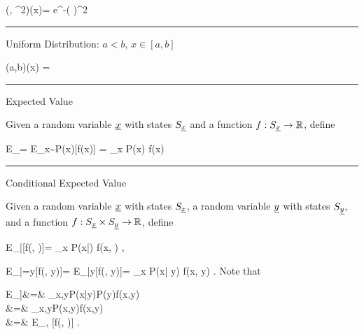 \beq 
\caln(\mu, \sigma^2)(x)=
e^{-\left(
\right)^2}
\eeq
\hrule\noindent
Uniform Distribution: $a<b$, $x\in [a,b]$

\beq
\calu(a,b)(x) =
\eeq
\hrule\noindent
Expected Value

Given a random variable ${\underline{x}}$ with states $S_{\underline{x}}$ and a function $f:S_{\underline{x}}\rightarrow { \mathbb{R}}$, define

\beq
E_\rvx[f(\rvx)]=
E_{x\sim P(x)}[f(x)] = \sum_x P(x) f(x)
\eeq
\hrule\noindent
Conditional Expected Value

Given a random variable ${\underline{x}}$ with states $S_{\underline{x}}$, a random variable ${\underline{y}}$ with states $S_{\underline{y}},$ and a function $f:S_{\underline{x}}\times S_{\underline{y}}\rightarrow { \mathbb{R}}$, define

\beq
E_{\rvx|\rvy}[f(\rvx, \rvy)]=
\sum_x P(x|\rvy) f(x, \rvy)
\;,
\eeq

\beq
E_{\rvx|\rvy=y}[f(\rvx, y)]=
E_{\rvx|y}[f(\rvx, y)]= \sum_x P(x| y) f(x, y)
\;.
\eeq
Note that

\beqa
E_\rvy[E_{\rvx|\rvy}[f(\rvx, \rvy)]]&=&
\sum_{x,y}P(x|y)P(y)f(x,y)
\\&=&
\sum_{x,y}P(x,y)f(x,y)
\\&=&
E_{\rvx, \rvy}[f(\rvx, \rvy)]
\;.
\eeqa


